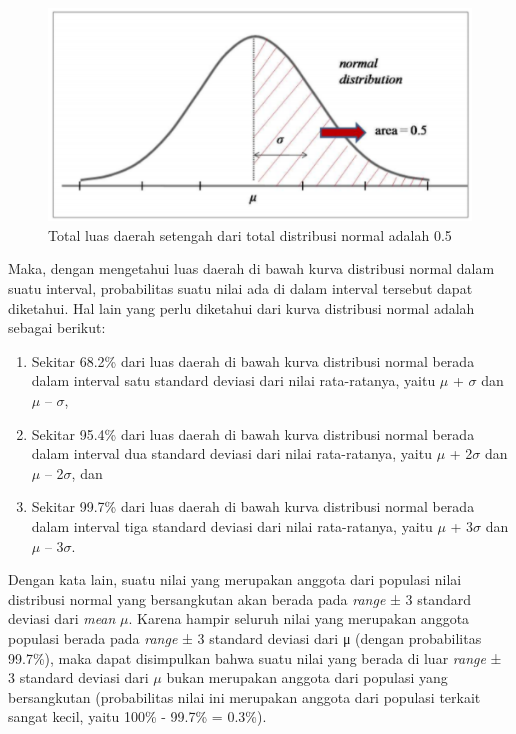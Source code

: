 \documentclass[
]{book}
\providecommand{\tightlist}{%
  \setlength{\itemsep}{0pt}\setlength{\parskip}{0pt}}
\begin{document}
\begin{figure}

{\centering \includegraphics[width=0.5\linewidth]{images/screening/distribusi_normal_0.5} 

}

\caption{Total luas daerah setengah dari total distribusi normal adalah 0.5}\label{fig:unnamed-chunk-5}
\end{figure}

Maka, dengan mengetahui luas daerah di bawah kurva distribusi normal dalam suatu interval, probabilitas suatu nilai ada di dalam interval tersebut dapat diketahui. Hal lain yang perlu diketahui dari kurva distribusi normal adalah sebagai berikut:

\begin{enumerate}
\def\labelenumi{\arabic{enumi}.}
\tightlist
\item
  Sekitar 68.2\% dari luas daerah di bawah kurva distribusi normal berada dalam interval satu
  standard deviasi dari nilai rata-ratanya, yaitu \(\mu\) + \(\sigma\) dan \(\mu\) -- \(\sigma\),
\item
  Sekitar 95.4\% dari luas daerah di bawah kurva distribusi normal berada dalam interval dua
  standard deviasi dari nilai rata-ratanya, yaitu \(\mu\) + 2\(\sigma\) dan \(\mu\) -- 2\(\sigma\), dan
\item
  Sekitar 99.7\% dari luas daerah di bawah kurva distribusi normal berada dalam interval tiga
  standard deviasi dari nilai rata-ratanya, yaitu \(\mu\) + 3\(\sigma\) dan \(\mu\) -- 3\(\sigma\).
\end{enumerate}

Dengan kata lain, suatu nilai yang merupakan anggota dari populasi nilai distribusi normal yang bersangkutan akan berada pada \emph{range} ± 3 standard deviasi dari \emph{mean} \(\mu\). Karena hampir seluruh nilai yang merupakan anggota populasi berada pada \emph{range} ± 3 standard deviasi dari μ (dengan probabilitas 99.7\%), maka dapat disimpulkan bahwa suatu nilai yang berada di luar \emph{range} ± 3 standard deviasi dari \(\mu\) bukan merupakan anggota dari populasi yang bersangkutan (probabilitas nilai ini merupakan anggota dari populasi terkait sangat kecil, yaitu 100\% - 99.7\% = 0.3\%).
\end{document}
